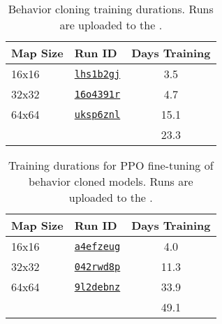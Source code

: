 \documentclass[conference,onecolumn]{IEEEtran}
\newcounter{supptable}
\newenvironment{supptable}
  {\renewcommand{\tablename}{Supplemental Table}\setcounter{table}{\value{supptable}}\addtocounter{supptable}{1}\begin{table}}
  {\end{table}\setcounter{supptable}{\value{table}}}
\begin{document}
\begin{supptable}[H]
    \caption{Behavior cloning training durations. Runs are uploaded to the \microRTSWBProject.}
    \label{tab:bc-training-durations}
    \begin{center}
    \begin{tabular}{llc}
        Map Size & Run ID & Days Training \\
        \midrule
        16x16 & \href{https://wandb.ai/\microRTSWBProjectPath/runs/lhs1b2gj}{\texttt{lhs1b2gj}} & 3.5 \\
        32x32 & \href{https://wandb.ai/\microRTSWBProjectPath/runs/16o4391r}{\texttt{16o4391r}} & 4.7 \\
        64x64 & \href{https://wandb.ai/\microRTSWBProjectPath/runs/uksp6znl}{\texttt{uksp6znl}} & 15.1 \\
        \hline
        \multicolumn{1}{l}{} & \multicolumn{1}{l}{} & 23.3
    \end{tabular}
    \end{center}
\end{supptable}

\begin{supptable}[H]
    \caption{Training durations for PPO fine-tuning of behavior cloned models. Runs are uploaded to the \microRTSWBProject.}
    \label{tab:bc-ppo-training-durations}
    \begin{center}
    \begin{tabular}{llc}
        Map Size & Run ID & Days Training \\
        \midrule
        16x16 & \href{https://wandb.ai/\microRTSWBProjectPath/runs/a4efzeug}{\texttt{a4efzeug}} & 4.0 \\
        32x32 & \href{https://wandb.ai/\microRTSWBProjectPath/runs/042rwd8p}{\texttt{042rwd8p}} & 11.3 \\
        64x64 & \href{https://wandb.ai/\microRTSWBProjectPath/runs/9l2debnz}{\texttt{9l2debnz}} & 33.9 \\
        \hline
        \multicolumn{1}{l}{} & \multicolumn{1}{l}{} & 49.1
    \end{tabular}
    \end{center}
\end{supptable}
\end{document}
